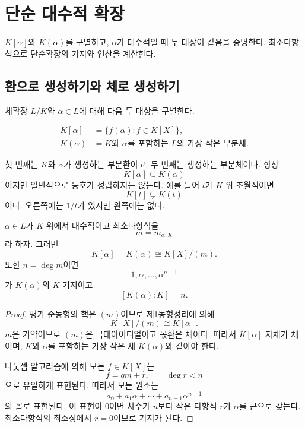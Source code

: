 \clearpage
\section{단순 대수적 확장}
\label{sec:simple-algebraic-extensions}

\begin{learninggoal}
$K[\alpha]$와 $K(\alpha)$를 구별하고, $\alpha$가 대수적일 때 두 대상이 같음을 증명한다. 최소다항식으로 단순확장의 기저와 연산을 계산한다.
\end{learninggoal}

\subsection{환으로 생성하기와 체로 생성하기}

체확장 $L/K$와 $\alpha\in L$에 대해 다음 두 대상을 구별한다.

\[
\begin{aligned}
  K[\alpha]&=\{f(\alpha):f\in K[X]\},\\
  K(\alpha)&=\text{$K$와 $\alpha$를 포함하는 $L$의 가장 작은 부분체}.
\end{aligned}
\]

첫 번째는 $K$와 $\alpha$가 생성하는 부분환이고, 두 번째는 생성하는 부분체이다. 항상
\[
  K[\alpha]\subseteq K(\alpha)
\]
이지만 일반적으로 등호가 성립하지는 않는다. 예를 들어 $t$가 $K$ 위 초월적이면
\[
  K[t]\subsetneq K(t)
\]
이다. 오른쪽에는 $1/t$가 있지만 왼쪽에는 없다.

\begin{theorem}
$\alpha\in L$가 $K$ 위에서 대수적이고 최소다항식을
\[
  m=m_{\alpha,K}
\]
라 하자. 그러면
\[
  K[\alpha]=K(\alpha)
  \cong K[X]/(m).
\]
또한 $n=\deg m$이면
\[
  1,\alpha,\dots,\alpha^{n-1}
\]
가 $K(\alpha)$의 $K$-기저이고
\[
  [K(\alpha):K]=n.
\]
\end{theorem}

\begin{proof}
평가 준동형의 핵은 $(m)$이므로 제1동형정리에 의해
\[
  K[X]/(m)\cong K[\alpha].
\]
$m$은 기약이므로 $(m)$은 극대아이디얼이고 몫환은 체이다. 따라서 $K[\alpha]$ 자체가 체이며, $K$와 $\alpha$를 포함하는 가장 작은 체 $K(\alpha)$와 같아야 한다.

나눗셈 알고리즘에 의해 모든 $f\in K[X]$는
\[
  f=qm+r,
  \qquad
  \deg r<n
\]
으로 유일하게 표현된다. 따라서 모든 원소는
\[
  a_0+a_1\alpha+\cdots+a_{n-1}\alpha^{n-1}
\]
의 꼴로 표현된다. 이 표현이 $0$이면 차수가 $n$보다 작은 다항식 $r$가 $\alpha$를 근으로 갖는다. 최소다항식의 최소성에서 $r=0$이므로 기저가 된다.
\end{proof}

